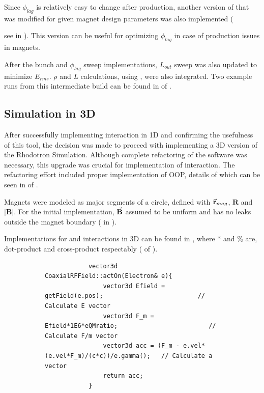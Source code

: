 \documentclass[a4paper,oneside,12pt]{report}
\numberwithin{equation}{chapter}
\begin{document}
Since $\phi_{lag}$ is relatively easy to change after production, another version of  that was modified for given magnet design parameters was also implemented ({see  in ). 
This version can be useful for optimizing $\phi_{lag}$ in case of production issues in magnets. 

After the bunch and $\phi_{lag}$ sweep implementations, $L_{out}$ sweep was also updated to minimize $E_{rms}$. $\rho$ and $L$ calculations, using , were also integrated. 
Two example runs from this intermediate build can be found in  of .

\subsection{Simulation in 3D}
After successfully implementing \eE interaction in 1D and confirming the usefulness of this tool, the decision was made to proceed with implementing a 3D version of the Rhodotron Simulation.
Although complete refactoring of the software was necessary, this upgrade was crucial for implementation of \eB interaction.
The refactoring effort included proper implementation of OOP, details of which can be seen in  of .

Magnets were modeled as major segments of a circle, defined with $\vec{\textbf{r}}_{mag}$, $\textbf{R}$ and $|\textbf{B}|$. 
For the initial implementation, $\vec{\textbf{B}}$ assumed to be uniform and has no leaks outside the magnet boundary ( in ).

Implementations for \eE and \eB interactions in 3D can be found in , 
where * and \% are, dot-product and cross-product respectably ( of ).
\iffalse \begin{figure}[H]
    \begin{subfigure}{\textwidth}
        \begin{verbatim}
            vector3d CoaxialRFField::actOn(Electron& e){
                vector3d Efield = getField(e.pos);                          // Calculate E vector
                vector3d F_m = Efield*1E6*eQMratio;                         // Calculate F/m vector
                vector3d acc = (F_m - e.vel*(e.vel*F_m)/(c*c))/e.gamma();   // Calculate a vector
                return acc;
            }
        \end{verbatim}
    \end{subfigure}


\end{figure}}
\end{document}
